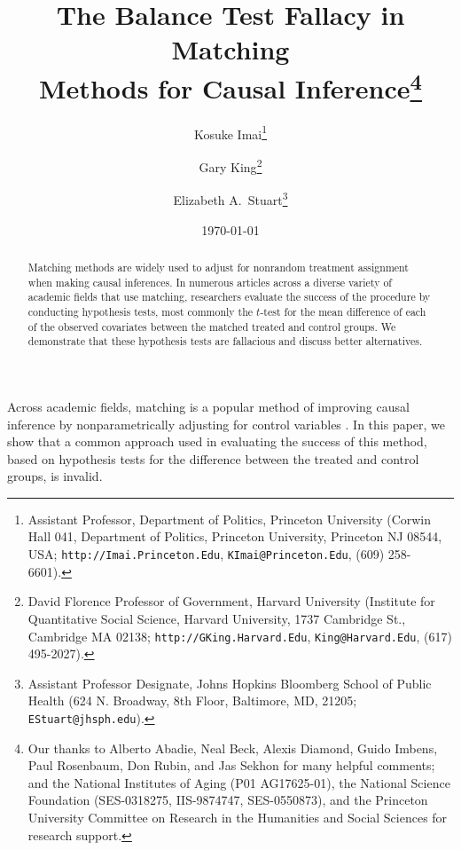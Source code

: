 \documentclass[11pt,titlepage]{article}
\title{The Balance Test Fallacy in Matching\\ Methods for Causal
  Inference\thanks{Our thanks to Alberto Abadie, Neal Beck, Alexis
    Diamond, Guido Imbens, Paul Rosenbaum, Don Rubin, and Jas Sekhon
    for many helpful comments; and the National Institutes of Aging
    (P01 AG17625-01), the National Science Foundation (SES-0318275,
    IIS-9874747, SES-0550873), and the Princeton University Committee
    on Research in the Humanities and Social Sciences for research
    support.}}
\author{Kosuke Imai\thanks{Assistant Professor, Department of
    Politics, Princeton University (Corwin Hall 041, Department of
    Politics, Princeton University, Princeton NJ 08544, USA;
    \texttt{http://Imai.Princeton.Edu}, \texttt{KImai@Princeton.Edu},
    (609) 258-6601).}
\and 
  Gary King\thanks{David Florence Professor of Government, Harvard
    University (Institute for Quantitative Social Science, Harvard
    University, 1737 Cambridge St., Cambridge MA 02138;
    \texttt{http://GKing.Harvard.Edu}, \texttt{King@Harvard.Edu},
    (617) 495-2027).}
\and 
  Elizabeth A.\ Stuart\thanks{Assistant Professor Designate, Johns Hopkins Bloomberg School
    of Public Health  (624 N. Broadway, 8th Floor, Baltimore, MD, 21205; 
    \texttt{EStuart@jhsph.edu}).}}
\date{\today}
\begin{document}
\maketitle

\begin{abstract}
  Matching methods are widely used to adjust for nonrandom treatment
  assignment when making causal inferences.  In numerous articles
  across a diverse variety of academic fields that use matching,
  researchers evaluate the success of the procedure by conducting
  hypothesis tests, most commonly the $t$-test for the mean difference
  of each of the observed covariates between the matched treated and
  control groups. We demonstrate that these hypothesis tests are
  fallacious and discuss better alternatives.
\end{abstract}

Across academic fields, matching is a popular method of improving
causal inference by nonparametrically adjusting for control variables
\citep{Imbens04,Rosenbaum02}.  In this paper, we show that a common
approach used in evaluating the success of this method, based on
hypothesis tests for the difference between the treated and control
groups, is invalid.
\end{document}
